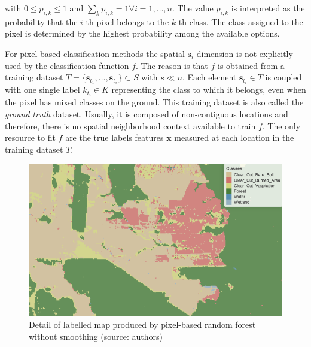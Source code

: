 \documentclass[
  shortnames]{jss}
\begin{document}
with \(0 \leq p_{i,k} \leq 1\) and \(\sum_k p_{i,k} = 1 \forall i = 1, \ldots, n\). The value \(p_{i,k}\) is interpreted as the probability that the \(i\)-th pixel belongs to the \(k\)-th class. The class assigned to the pixel is determined by the highest probability among the available options.

For pixel-based classification methods the spatial \(\mathbf{s}_i\) dimension is not explicitly used by the classification function \(f\). The reason is that \(f\) is obtained from a training dataset \(T = \{ \mathbf{s}_{t_1}, \ldots, \mathbf{s}_{t_s} \} \subset S\) with \(s \ll n\). Each element \(\mathbf{s}_{t_i} \in T\) is coupled with one single label \(k_{t_i} \in K\) representing the class to which it belongs, even when the pixel has mixed classes on the ground. This training dataset is also called the \textit{ground truth} dataset. Usually, it is composed of non-contiguous locations and therefore, there is no spatial neighborhood context available to train \(f\). The only resource to fit \(f\) are the true labels features \(\mathbf{x}\) measured at each location in the training dataset \(T\).

\begin{CodeChunk}
\begin{figure}[!h]

{\centering \includegraphics[width=0.7\linewidth]{images/map_no_smooth_v2} 

}

\caption[Detail of labelled map produced by pixel-based random forest without smoothing (source]{Detail of labelled map produced by pixel-based random forest without smoothing (source: authors)}\label{fig:mapnosmooth}
\end{figure}
\end{CodeChunk}
\end{document}
